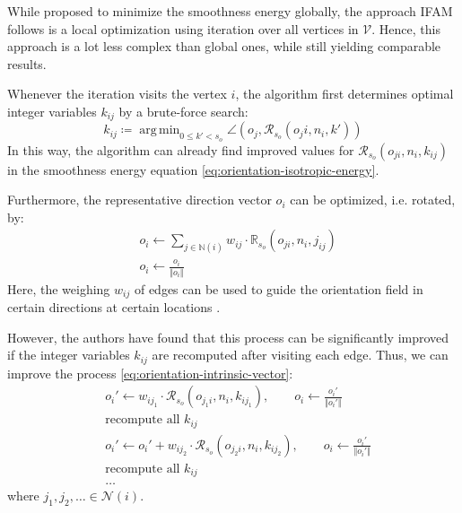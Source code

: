 \documentclass{ACGSeminar}
\DeclareMathOperator*{\argmin}{arg\,min}
\begin{document}
While \cite{bommes2009mixed} proposed to minimize the smoothness energy globally, the approach IFAM follows is a local optimization using iteration over all vertices in $\mathcal{V}$. Hence, this approach is a lot less complex than global ones, while still yielding comparable results.

Whenever the iteration visits the vertex $i$, the algorithm first determines optimal integer variables $k_{ij}$ by a brute-force search:
\begin{equation}\label{eq:orientation-intrinsic-integer}
	k_{ij} \coloneqq \argmin_{0 \leq k' < s_o} \angle(o_j, \mathcal{R}_{s_o}(o_ji, n_i, k'))
\end{equation}
In this way, the algorithm can already find improved values for $\mathcal{R}_{s_o}(o_{ji}, n_i, k_{ij})$ in the smoothness energy equation \eqref{eq:orientation-isotropic-energy}.

Furthermore, the representative direction vector $o_i$ can be optimized, i.e. rotated, by:
\begin{equation}\label{eq:orientation-intrinsic-vector}
\begin{split}
	& o_i \leftarrow \sum_{j \in \mathbb{N}(i)} w_{ij} \cdot \mathbb{R}_{s_o}(o_{ji}, n_i, j_{ij})\\
	& o_i \leftarrow \frac{o_i}{\Vert o_i \Vert}
\end{split}
\end{equation}
Here, the weighing $w_{ij}$ of edges can be used to guide the orientation field in certain directions at certain locations \cite{jakob2015instant}.\bigskip

However, the authors have found that this process can be significantly improved if the integer variables $k_{ij}$ are recomputed after visiting each edge. Thus, we can improve the process \eqref{eq:orientation-intrinsic-vector}:
\begin{equation}
\begin{split}
	& o_i' \leftarrow w_{ij_1} \cdot \mathcal{R}_{s_o}(o_{j_1i}, n_i, k_{ij_1}), \qquad o_i \leftarrow \frac{o_i'}{\Vert o_i' \Vert}\\
	& \textrm{recompute all } k_{ij}\\
	& o_i' \leftarrow o_i' + w_{ij_2} \cdot \mathcal{R}_{s_o}(o_{j_2i}, n_i, k_{ij_2}), \qquad o_i \leftarrow \frac{o_i'}{\Vert o_i' \Vert}\\
	& \textrm{recompute all } k_{ij}\\
	& \dots
\end{split}
\end{equation}
where $j_1, j_2, \dots \in \mathcal{N}(i)$.
\end{document}
